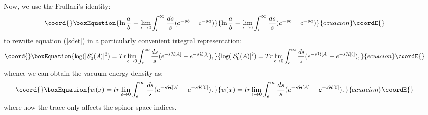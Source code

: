 \documentclass[a4paper,12pt]{article}
\begin{document}
Now,  we use the Frullani's identity:
\begin{equation}\coord{}\boxEquation{
\ln \frac{a}{b}=\lim_{\epsilon \to 0} \int_\epsilon^\infty \frac{ds}{s}(e^{-sb}-e^{-sa})
}{
\ln \frac{a}{b}=\lim_{\epsilon \to 0} \int_\epsilon^\infty \frac{ds}{s}(e^{-sb}-e^{-sa})
}{ecuacion}\coordE{}\end{equation}
to rewrite equation (\ref{sdet}) in a particularly convenient integral
representation:
\begin{equation}\coord{}\boxEquation{\label{str}
\log(|{\mathcal S}'_0(A)|^2)= Tr \lim_{\epsilon \to 0} \int_\epsilon ^\infty \frac{ds}{s} (e^{-s{\mathcal H}[A]}-e^{-s{\mathcal H}[0]}),
}{\log(|{\mathcal S}'_0(A)|^2)= Tr \lim_{\epsilon \to 0} \int_\epsilon ^\infty \frac{ds}{s} (e^{-s{\mathcal H}[A]}-e^{-s{\mathcal H}[0]}),
}{ecuacion}\coordE{}\end{equation}
whence we can obtain the vacuum energy density as: 
\begin{equation}\coord{}\boxEquation{\label{wtr}
w(x) = tr \lim_{\epsilon \to 0} \int_\epsilon ^\infty \frac{ds}{s} (e^{-s{\mathcal H}[A]}-e^{-s{\mathcal H}[0]}),
}{w(x) = tr \lim_{\epsilon \to 0} \int_\epsilon ^\infty \frac{ds}{s} (e^{-s{\mathcal H}[A]}-e^{-s{\mathcal H}[0]}),
}{ecuacion}\coordE{}\end{equation}
where now the trace only affects the spinor space indices.
\end{document}
